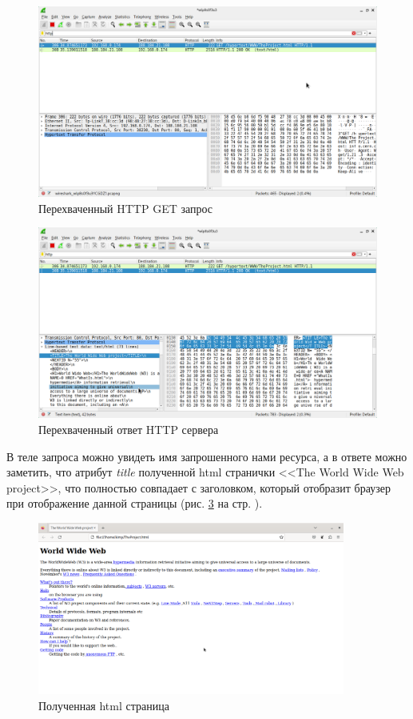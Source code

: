 \documentclass[a4paper]{article}
\begin{document}
  \begin{figure}[H]
    \centering
    \includegraphics[width=1.0\textwidth]{01_0008}
    \caption{Перехваченный HTTP GET запрос}
    \label{img:0008}
  \end{figure}

  \begin{figure}[H]
    \centering
    \includegraphics[width=1.0\textwidth]{01_0009}
    \caption{Перехваченный ответ HTTP сервера}
    \label{img:0009}
  \end{figure}

  В теле запроса можно увидеть имя запрошенного нами ресурса, а в ответе можно заметить, что
  атрибут \textit{title} полученной html странички <<The World Wide Web project>>, что 
  полностью совпадает с заголовком, который отобразит браузер при отображение данной страницы
  (рис. \ref{img:0010} на стр. \pageref{img:0010}).

  \begin{figure}[H]
    \centering
    \includegraphics[width=0.9\textwidth]{01_0010}
    \caption{Полученная html страница}
    \label{img:0010}
  \end{figure}
\end{document}
